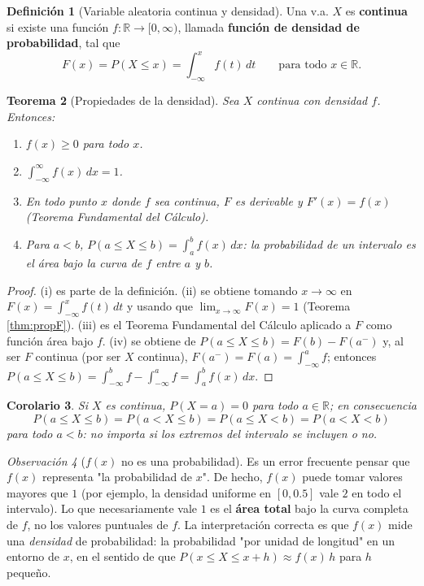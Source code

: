 \documentclass[11pt,a4paper]{article}
\theoremstyle{plain}
\newtheorem{teorema}{Teorema}[section]
\newtheorem{corolario}[teorema]{Corolario}
\theoremstyle{definition}
\newtheorem{definicion}[teorema]{Definición}
\theoremstyle{remark}
\newtheorem{observacion}[teorema]{Observación}
\begin{document}
\begin{definicion}[Variable aleatoria continua y densidad]
Una v.a. $X$ es \textbf{continua} si existe una función $f:\mathbb{R}\to[0,\infty)$, llamada \textbf{función de densidad de probabilidad}, tal que
$$F(x)=P(X\le x)=\int_{-\infty}^x f(t)\,dt\qquad\text{para todo }x\in\mathbb{R}.$$
\end{definicion}

\begin{teorema}[Propiedades de la densidad]
Sea $X$ continua con densidad $f$. Entonces:
\begin{enumerate}[label=(\roman*)]
\item $f(x)\ge0$ para todo $x$.
\item $\displaystyle\int_{-\infty}^{\infty}f(x)\,dx=1$.
\item En todo punto $x$ donde $f$ sea continua, $F$ es derivable y $F'(x)=f(x)$ (Teorema Fundamental del Cálculo).
\item Para $a<b$, $\displaystyle P(a\le X\le b)=\int_a^b f(x)\,dx$: la probabilidad de un intervalo es el área bajo la curva de $f$ entre $a$ y $b$.
\end{enumerate}
\end{teorema}
\begin{proof}
(i) es parte de la definición. (ii) se obtiene tomando $x\to\infty$ en $F(x)=\int_{-\infty}^x f(t)\,dt$ y usando que $\lim_{x\to\infty}F(x)=1$ (Teorema \ref{thm:propF}). (iii) es el Teorema Fundamental del Cálculo aplicado a $F$ como función área bajo $f$. (iv) se obtiene de $P(a\le X\le b)=F(b)-F(a^-)$ y, al ser $F$ continua (por ser $X$ continua), $F(a^-)=F(a)=\int_{-\infty}^a f$; entonces $P(a\le X\le b)=\int_{-\infty}^bf-\int_{-\infty}^af=\int_a^bf(x)\,dx$.
\end{proof}

\begin{corolario}
Si $X$ es continua, $P(X=a)=0$ para todo $a\in\mathbb{R}$; en consecuencia
$$P(a\le X\le b)=P(a<X\le b)=P(a\le X<b)=P(a<X<b)$$
para todo $a<b$: no importa si los extremos del intervalo se incluyen o no.
\end{corolario}

\begin{observacion}[$f(x)$ no es una probabilidad]
Es un error frecuente pensar que $f(x)$ representa "la probabilidad de $x$". De hecho, $f(x)$ puede tomar valores mayores que $1$ (por ejemplo, la densidad uniforme en $[0,0.5]$ vale $2$ en todo el intervalo). Lo que necesariamente vale $1$ es el \textbf{área total} bajo la curva completa de $f$, no los valores puntuales de $f$. La interpretación correcta es que $f(x)$ mide una \emph{densidad} de probabilidad: la probabilidad "por unidad de longitud" en un entorno de $x$, en el sentido de que $P(x\le X\le x+h)\approx f(x)\,h$ para $h$ pequeño.
\end{observacion}
\end{document}
